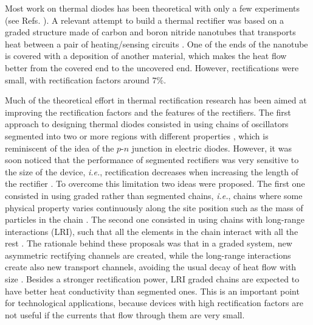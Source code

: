 Most work on thermal diodes has been theoretical with only a few experiments (see Refs. \cite{Chang2006,Kobayashi2009,Leitner2013,Elzouka2017}).
A relevant attempt to build a thermal rectifier was based on a graded structure made of carbon and boron nitride nanotubes that transports heat between a pair of heating/sensing circuits \cite{Chang2006}. One of the ends of the nanotube is covered with a deposition of another material, which makes the heat flow better from the covered end to the uncovered end. However, rectifications were small, with rectification factors around $7\%$.

Much of the theoretical effort in thermal rectification research has been aimed at improving the rectification factors and the features of the rectifiers. The first approach to designing thermal diodes consisted in using chains of oscillators segmented into two or more regions with different properties \cite{Terraneo2002,Li2004,Li2008,Hu2006}, which is reminiscent of the idea of the $p$-$n$ junction in electric diodes. However, it was soon noticed that the performance of segmented rectifiers was very sensitive to the size of the device, \textit{i.e.}, rectification decreases when increasing the length of the rectifier \cite{Hu2006}. To overcome this limitation two ideas were proposed. The first one consisted in using graded rather than segmented chains, \textit{i.e.}, chains where some physical property varies continuously along the site position such as the mass of particles in the chain \cite{Wang2012,Chen2015,Romero-Bastida2017,Yang2007,Romero-Bastida2013,Dettori2016,Pereira2010,Pereira2011,Avila2013}. The second one consisted in using chains with long-range interactions (LRI), such that all the elements in the chain interact with all the rest \cite{Chen2015,Bagchi2017,Pereira2013}. The rationale behind these proposals was that in a graded system, new asymmetric rectifying channels are created, while the long-range interactions create
also new transport channels, avoiding the usual decay of heat flow with size \cite{Chen2015}. Besides a stronger rectification power, LRI graded chains are expected to have better heat conductivity than segmented ones. This is an important point for technological applications, because devices with high rectification factors are not useful if the currents that flow through them are very small.

